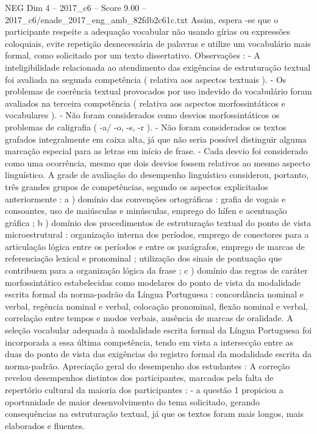 \begin{textsample}{NEG Dim 4 – 2017\_c6 – Score 9.00 – 2017\_c6/enade\_2017\_eng\_amb\_82fdb2c61c.txt}
Assim, espera -se que o participante respeite a adequação vocabular não usando gírias ou expressões coloquiais, evite repetição desnecessária de palavras e utilize um vocabulário mais formal, como solicitado por um texto dissertativo.
Observações : - A inteligibilidade relacionada ao atendimento das exigências de estruturação textual foi avaliada na segunda competência ( relativa aos aspectos textuais ). - Os problemas de coerência textual provocados por uso indevido do vocabulário foram avaliados na terceira competência ( relativa aos aspectos morfossintáticos e vocabulares ). - Não foram considerados como desvios morfossintáticos os problemas de caligrafia ( -a/ -o, -s, -r ). - Não foram considerados os textos grafados integralmente em caixa alta, já que não seria possível distinguir alguma marcação especial para as letras em início de frase. - Cada desvio foi considerado como uma ocorrência, mesmo que dois desvios fossem relativos ao mesmo aspecto linguístico.
A grade de avaliação do desempenho linguístico considerou, portanto, três grandes grupos de competências, segundo os aspectos explicitados anteriormente : a ) domínio das convenções ortográficas : grafia de vogais e consoantes, uso de maiúsculas e minúsculas, emprego do hífen e acentuação gráfica ; b ) domínio dos procedimentos de estruturação textual do ponto de vista microestrutural : organização interna dos períodos, emprego de conectores para a articulação lógica entre os períodos e entre os parágrafos, emprego de marcas de referenciação lexical e pronominal ; utilização dos sinais de pontuação que contribuem para a organização lógica da frase ; c ) domínio das regras de caráter morfossintático estabelecidas como modelares do ponto de vista da modalidade escrita formal da norma-padrão da Língua Portuguesa : concordância nominal e verbal, regência nominal e verbal, colocação pronominal, flexão nominal e verbal, correlação entre tempos e modos verbais, ausência de marcas de oralidade.
A seleção vocabular adequada à modalidade escrita formal da Língua Portuguesa foi incorporada a essa última competência, tendo em vista a intersecção entre as duas do ponto de vista das exigências do registro formal da modalidade escrita da norma-padrão.
Apreciação geral do desempenho dos estudantes : A correção revelou desempenhos distintos dos participantes, marcados pela falta de repertório cultural da maioria dos participantes : - a questão 1 propiciou a oportunidade de maior desenvolvimento do tema solicitado, gerando consequências na estruturação textual, já que os textos foram mais longos, mais elaborados e fluentes.

\end{textsample}

